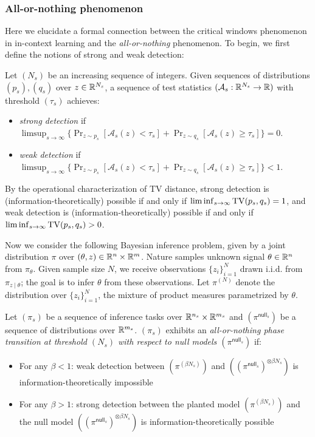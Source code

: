\subsubsection{All-or-nothing phenomenon}
Here we elucidate a formal connection between the critical windows phenomenon in in-context learning and the \emph{all-or-nothing} phenomenon. To begin, we first define the notions of strong and weak detection:
\begin{definition}
    Let $(N_s)$ be an increasing sequence of integers. Given sequences of distributions $(p_s), (q_s)$ over $z\in\mathbb{R}^{N_s}$, a sequence of test statistics $(\mathcal{A}_s: \mathbb{R}^{N_s} \to \mathbb{R})$ with threshold $(\tau_s)$ achieves:
    \begin{itemize}
        \item \emph{strong detection} if $\limsup_{s\to\infty} \{\Pr_{z\sim p_s}[\mathcal{A}_s(z) < \tau_s] + \Pr_{z\sim q_s}[\mathcal{A}_s(z) \ge \tau_s]\} = 0$.
        \item \emph{weak detection} if $\limsup_{s\to\infty} \{\Pr_{z\sim p_s}[\mathcal{A}_s(z) < \tau_s] + \Pr_{z\sim q_s}[\mathcal{A}_s(z) \ge \tau_s]\} < 1$.
    \end{itemize}
\end{definition}
By the operational characterization of TV distance, strong detection is (information-theoretically) possible if and only if $\liminf_{s\to\infty}\mathrm{TV}(p_s,q_s) = 1$, and weak detection is (information-theoretically) possible if and only if $\liminf_{s\to\infty}\mathrm{TV}(p_s,q_s) > 0$. 

Now we consider the following Bayesian inference problem, given by a joint distribution $\pi$ over $(\theta,z) \in \mathbb{R}^n\times \mathbb{R}^m$. Nature samples unknown signal $\theta \in \mathbb{R}^n$ from $\pi_\theta$. Given sample size $N$, we receive observations $\{z_i\}_{i=1}^N$ drawn i.i.d. from $\pi_{z\mid \theta}$; the goal is to infer $\theta$ from these observations. Let $\pi^{(N)}$ denote the distribution over $\{z_i\}_{i=1}^N$, the mixture of product measures parametrized by $\theta$.
\begin{definition}
    Let $(\pi_s)$ be a sequence of inference tasks over $\mathbb{R}^{n_s}\times \mathbb{R}^{m_s}$ and $(\pi^{\mathsf{null}_s})$ be a sequence of distributions over $\mathbb{R}^{m_s}$. $(\pi_s)$ exhibits an \emph{all-or-nothing phase transition at threshold $(N_s)$ with respect to null models $(\pi^{\mathsf{null}_s})$} if:
    \begin{itemize}[noitemsep,topsep=0pt]
        \item For any $\beta < 1$: weak detection between $(\pi^{(\beta N_s)})$ and $((\pi^{\mathsf{null}_s})^{\otimes \beta N_s})$ is information-theoretically impossible
        \item For any $\beta > 1$: strong detection between the planted model $(\pi^{(\beta N_s)})$ and the null model $((\pi^{\mathsf{null}_s})^{\otimes \beta N_s})$ is information-theoretically possible
    \end{itemize}
\end{definition}

